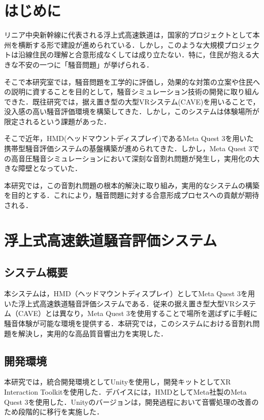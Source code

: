 \documentclass[10pt]{jsarticle}
\begin{document}

\section{はじめに}
リニア中央新幹線に代表される浮上式高速鉄道は，国家的プロジェクトとして本州を横断する形で建設が進められている．しかし，このような大規模プロジェクトは沿線住民の理解と合意形成なくしては成り立たない．特に，住民が抱える大きな不安の一つに「騒音問題」が挙げられる．

そこで本研究室では，騒音問題を工学的に評価し，効果的な対策の立案や住民への説明に資することを目的として，騒音シミュレーション技術の開発に取り組んできた．既往研究では，据え置き型の大型VRシステム(CAVE)を用いることで，没入感の高い騒音評価環境を構築してきた．しかし，このシステムは体験場所が限定されるという課題があった．

そこで近年，HMD(ヘッドマウントディスプレイ)であるMeta Quest 3を用いた携帯型騒音評価システムの基盤構築が進められてきた．しかし，Meta Quest 3での高音圧騒音シミュレーションにおいて深刻な音割れ問題が発生し，実用化の大きな障壁となっていた．

本研究では，この音割れ問題の根本的解決に取り組み，実用的なシステムの構築を目的とする．これにより，騒音問題に対する合意形成プロセスへの貢献が期待される．

\section{浮上式高速鉄道騒音評価システム}
\subsection{システム概要}
本システムは，HMD（ヘッドマウントディスプレイ）としてMeta Quest 3を用いた浮上式高速鉄道騒音評価システムである．従来の据え置き型大型VRシステム（CAVE）とは異なり，Meta Quest 3を使用することで場所を選ばずに手軽に騒音体験が可能な環境を提供する．本研究では，このシステムにおける音割れ問題を解決し，実用的な高品質音響出力を実現した．

\subsection{開発環境}
本研究では，統合開発環境としてUnityを使用し，開発キットとしてXR Interaction Toolkitを使用した．デバイスには，HMDとしてMeta社製のMeta Quest 3を使用した．Unityのバージョンは，開発過程において音響処理の改善のため段階的に移行を実施した．
\end{document}
